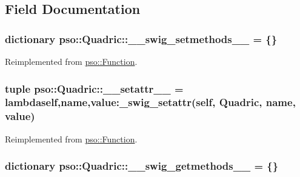 \subsection{Field Documentation}
\hypertarget{classpso_1_1Quadric_5953ccca68eb821e48ff2953838604b7}{
\subsubsection{\setlength{\rightskip}{0pt plus 5cm}dictionary {\bf pso::Quadric::\_\-\_\-swig\_\-setmethods\_\-\_\-} = \{\}}}
\label{classpso_1_1Quadric_5953ccca68eb821e48ff2953838604b7}




Reimplemented from \hyperlink{classpso_1_1Function_2334bfe507115d58047f67960dde71d3}{pso::Function}.\hypertarget{classpso_1_1Quadric_39d18c5e187c40c760304ac789fd813c}{
\subsubsection{\setlength{\rightskip}{0pt plus 5cm}tuple {\bf pso::Quadric::\_\-\_\-setattr\_\-\_\-} = lambdaself,name,value:\_\-swig\_\-setattr(self, {\bf Quadric}, name, value)}}
\label{classpso_1_1Quadric_39d18c5e187c40c760304ac789fd813c}




Reimplemented from \hyperlink{classpso_1_1Function_cd8775cf6aadc3fdf4e6d82158ef10fb}{pso::Function}.\hypertarget{classpso_1_1Quadric_d98a08d9dc318dfb0799dc8a0f442370}{
\subsubsection{\setlength{\rightskip}{0pt plus 5cm}dictionary {\bf pso::Quadric::\_\-\_\-swig\_\-getmethods\_\-\_\-} = \{\}}}
\label{classpso_1_1Quadric_d98a08d9dc318dfb0799dc8a0f442370}




